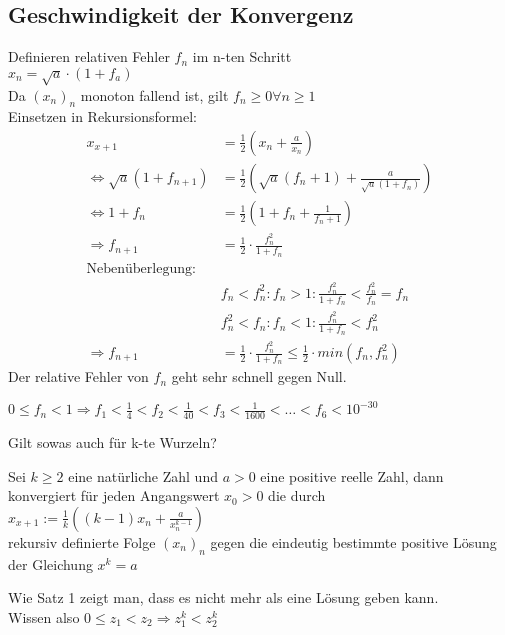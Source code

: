 \documentclass[../ana1u.tex]{subfiles}
\begin{document}
\begin{bsp}
    \subsection{Geschwindigkeit der Konvergenz}
    Definieren relativen Fehler \(f_n\) im n-ten Schritt\\
    \(x_n = \sqrt{a} \cdot (1+f_a)\)\\
    Da \((x_n)_n\) monoton fallend ist, gilt \(f_n \geq 0 \forall n \geq 1\)\\
    Einsetzen in Rekursionsformel:\\
    \begin{align*}
        x_{x+1} &= \frac{1}{2}\left(x_n + \frac{a}{x_n}\right)\\
        \Leftrightarrow \sqrt{a}(1+f_{n+1}) &= \frac{1}{2}\left(\sqrt{a}(f_n+1) + \frac{a}{\sqrt{a}(1+f_n)} \right)\\
        \Leftrightarrow 1 + f_n &= \frac{1}{2}\left(1+f_n+\frac{1}{f_n + 1}\right)\\
        \Rightarrow f_{n+1} &= \frac{1}{2} \cdot \frac{f_n^2}{1 + f_n}\\
        \text{Nebenüberlegung:}\\
        &f_n < f_n^2: f_n > 1: \frac{f_n^2}{1+f_n} < \frac{f_n^2}{f_n} = f_n\\
        &f_n^2 < f_n: f_n < 1: \frac{f_n^2}{1+f_n} < f_n^2 \\
        \Rightarrow f_{n+1} &= \frac{1}{2} \cdot \frac{f_n^2}{1+f_n} \leq \frac{1}{2} \cdot min(f_n, f_n^2)
    \end{align*}
    Der relative Fehler von \(f_n\) geht sehr schnell gegen Null.
    \begin{bsp}
        \(0\leq f_n < 1 \Rightarrow f_1 < \frac{1}{4} < f_2 < \frac{1}{40} < f_3 < \frac{1}{1600} < \ldots < f_6 < 10^{-30}\)
    \end{bsp}
    Gilt sowas auch für k-te Wurzeln?
    \begin{satz}
        Sei \(k \geq 2 \) eine natürliche Zahl und \(a > 0\) eine positive reelle Zahl, dann konvergiert für jeden Angangswert \(x_0 > 0\) die durch\\
        \(x_{x+1} := \frac{1}{k} \left((k-1)x_n + \frac{a}{x_n^{k-1}}\right)\)\\
        rekursiv definierte Folge \((x_n)_n\) gegen die eindeutig bestimmte positive Lösung der Gleichung \(x^k = a\)
    \end{satz}
    \begin{bew}
        Wie Satz 1 zeigt man, dass es nicht mehr als eine Lösung geben kann.\\Wissen also \(0 \leq z_1 < z_2 \Rightarrow z_1^k < z_2^k\)\\

\end{bew}
\end{bsp}
\end{document}
